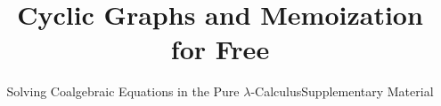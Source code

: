 \newcommand{\Sh}{\mathsf{Sh}}
\newcommand{\Lamsh}{\mathsf{Lam}}
\newcommand{\Appsh}{\mathsf{App}}
\newcommand{\Varsh}{\mathsf{Var}}
\newcommand{\dlam}{\mathord{\downarrow}\lambda}
\newcommand{\dhead}{\mathord{\downarrow}\mathsf{h}}
\newcommand{\darg}{\mathord{\downarrow}\mathsf{a}}
\newcommand{\subt}[2]{#1\!\downarrow\!#2}
\newcommand{\reduces}{\twoheadrightarrow}
\newcommand{\bred}{\rightarrow_{\beta}}
\newcommand{\present}{\mathtt{present}}


\makeatletter
{}
\makeatother



\title{Cyclic Graphs and Memoization for Free}
\ifColambdaBody
  \subtitle{Solving Coalgebraic Equations in the Pure $\lambda$-Calculus}
\else
  \subtitle{Supplementary Material}
\fi

